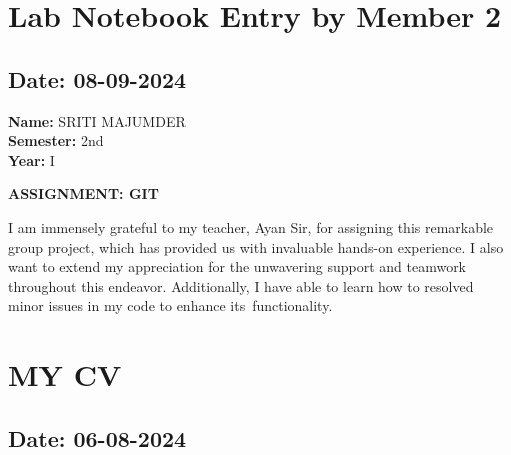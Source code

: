 \documentclass[12pt]{article}
\begin{document}
\section{Lab Notebook Entry by Member 2}
\subsection*{Date: 08-09-2024}

\begin{flushright}
\textbf{Name:} SRITI MAJUMDER \\
\textbf{Semester:} 2nd \\
\textbf{Year:} I \\
\end{flushright}

\begin{center}
\Huge \textbf{ASSIGNMENT: GIT}
\end{center}

I am immensely grateful to my teacher, Ayan Sir, for assigning this remarkable group project, which has provided us with invaluable hands-on experience. I also want to extend my appreciation for the unwavering support and teamwork throughout this endeavor. Additionally, I have able to learn how to  resolved minor issues in my  code to enhance its functionality.


\newpage
\section{MY CV}
\subsection*{Date: 06-08-2024}
\end{document}

